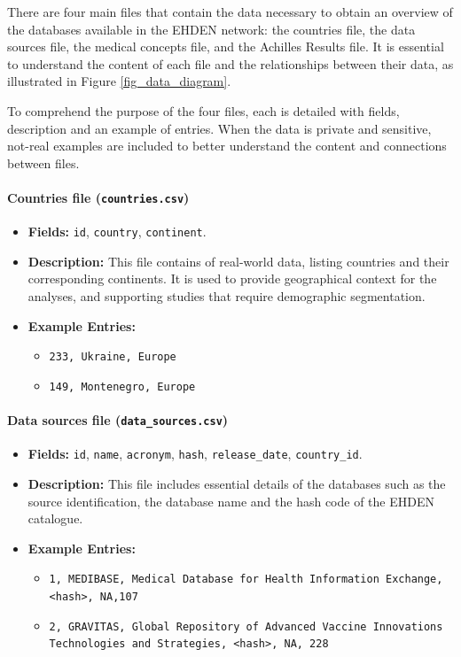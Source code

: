 There are four main files that contain the data necessary to obtain an overview of the databases available in the EHDEN network: the countries file, the data sources file, the medical concepts file, and the Achilles Results file. It is essential to understand the content of each file and the relationships between their data, as illustrated in Figure \ref{fig_data_diagram}.

To comprehend the purpose of the four files, each is detailed with fields, description and an example of entries. When the data is private and sensitive, not-real examples are included to better understand the content and connections between files.


\paragraph{Countries file {\small\normalfont(\texttt{countries.csv})}}

\begin{itemize}
    \item \textbf{Fields:} \texttt{id}, \texttt{country}, \texttt{continent}.
    \item \textbf{Description:} This file contains of real-world data, listing countries and their corresponding continents. It is used to provide geographical context for the analyses, and supporting studies that require demographic segmentation.
    \item \textbf{Example Entries:}
    \begin{itemize}
        \item \texttt{233, Ukraine, Europe}
        \item \texttt{149, Montenegro, Europe}
    \end{itemize}
\end{itemize}


\paragraph{Data sources file {\small\normalfont(\texttt{data\_sources.csv})}}

\begin{itemize}
    \item {\raggedright\textbf{Fields:} \texttt{id}, \texttt{name}, \texttt{acronym}, \texttt{hash}, \texttt{release\_date}, \texttt{country\_id}.\par}
    \item \textbf{Description:} This file includes essential details of the databases such as the source identification, the database name and the hash code of the EHDEN catalogue.
    \item \textbf{Example Entries:}
    \begin{itemize}
        \item \texttt{1, MEDIBASE, Medical Database for Health Information Exchange, <hash>, NA,107}
        \item \texttt{2, GRAVITAS, Global Repository of Advanced Vaccine Innovations Technologies and Strategies, <hash>, NA, 228}
    \end{itemize}
\end{itemize}

